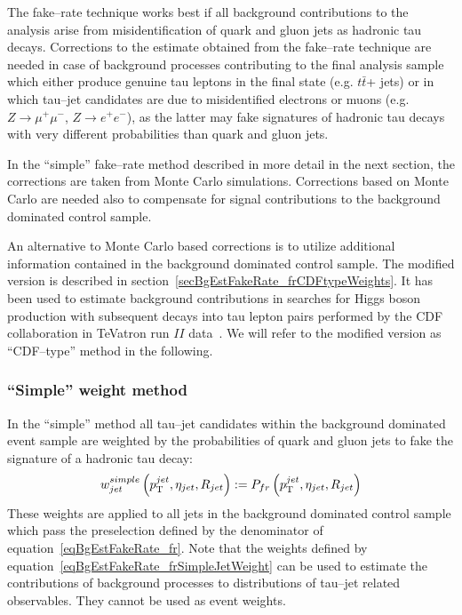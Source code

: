 The fake--rate technique works best if all background contributions to the
analysis arise from misidentification of quark and gluon jets as hadronic tau
decays.  Corrections to the estimate obtained from the fake--rate technique  are
needed in case of background processes contributing to the final analysis sample
which either produce genuine tau leptons in the final state (e.g. $t\bar{t}$+
jets) or in which tau--jet candidates are due to misidentified electrons or
muons (e.g. $Z \rightarrow \mu^{+} \mu^{-}$, $Z \rightarrow e^{+} e^{-}$), as
the latter may fake signatures of hadronic tau decays with very different
probabilities than quark and gluon jets.

In the ``simple'' fake--rate method described in more detail in the next
section, the corrections are taken from Monte Carlo simulations.  Corrections
based on Monte Carlo are needed also to compensate for signal contributions to
the background dominated control sample.

An alternative to Monte Carlo based corrections is to utilize additional
information contained in the background dominated control sample.  The modified
version is described in section~\ref{secBgEstFakeRate_frCDFtypeWeights}.  It has
been used to estimate background contributions in searches for Higgs boson
production with subsequent decays into tau lepton pairs performed by the CDF
collaboration in TeVatron run $II$ data~\cite{CDFMSSMHiggs,
CDFFakerateDJang, CDFFakerateAlmenar}.  We will
refer to the modified version as ``CDF--type'' method in the following.

\subsubsection{``Simple'' weight method}

In the ``simple'' method all tau--jet candidates within the background dominated
event sample are weighted by the probabilities of quark and gluon jets to fake
the signature of a hadronic tau decay:
\begin{equation}
w_{jet}^{simple} \left( p_{\mathrm{T}}^{jet}, \eta_{jet}, R_{jet} \right) := P_{fr} \left( p_{\mathrm{T}}^{jet}, \eta_{jet}, R_{jet} \right)
\label{eqBgEstFakeRate_frSimpleJetWeight}
\end{equation}
These weights are applied to all jets in the background dominated control sample
which pass the preselection defined by the denominator of
equation~\ref{eqBgEstFakeRate_fr}.  Note that the weights defined by
equation~\ref{eqBgEstFakeRate_frSimpleJetWeight} can be used to estimate the
contributions of background processes to distributions of tau--jet related
observables.  They cannot be used as event weights.

